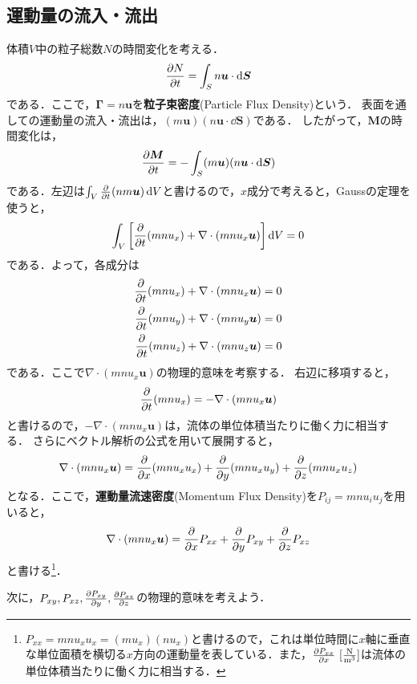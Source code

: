 \documentclass{report}
\begin{document}
    \subsection{運動量の流入・流出}
      体積$V$中の粒子総数$N$の時間変化を考える．
      \begin{align}
        \pdv{N}{t} = \int_S n\bm{u} \cdot \dd{\bm{S}}
      \end{align}
      である．ここで，$\bm{\Gamma} = n\bm{u}$を\textbf{粒子束密度}(Particle Flux Density)という．
      表面を通しての運動量の流入・流出は，$(m\bm{u})(n\bm{u}\cdot \dd{\bm{S}})$である．
      したがって，$\bm{M}$の時間変化は，
      \begin{align}
        \pdv{\bm{M}}{t} = -\int_S (m\bm{u})(n\bm{u}\cdot \dd{\bm{S}})
      \end{align}
      である．左辺は$\int_V \pdv{t}(n m \bm{u}) \dd{V}$と書けるので，$x$成分で考えると，Gaussの定理を使うと，
      \begin{align}
        \int_V \qty[\pdv{t}(mnu_x) + \nabla \cdot (mnu_x \bm{u})] \dd{V} = 0
      \end{align}
      である．よって，各成分は
      \begin{align}
        \pdv{t}(mnu_x) + \nabla \cdot (mnu_x \bm{u}) = 0\\
        \pdv{t}(mnu_y) + \nabla \cdot (mnu_y \bm{u}) = 0\\
        \pdv{t}(mnu_z) + \nabla \cdot (mnu_z \bm{u}) = 0
      \end{align}
      である．ここで$\nabla \cdot (mnu_x \bm{u}) $の物理的意味を考察する．
      右辺に移項すると，
      \begin{align}
        \pdv{t}(mnu_x) = -\nabla \cdot (mnu_x \bm{u})
      \end{align}
      と書けるので，$-\nabla \cdot (mnu_x \bm{u})$は，流体の単位体積当たりに働く力に相当する．
      さらにベクトル解析の公式を用いて展開すると，
      \begin{align}
        \nabla \cdot (mnu_x \bm{u}) = \pdv{x}(mnu_x u_x) + \pdv{y}(mnu_x u_y) + \pdv{z}(mnu_x u_z)
      \end{align}
      となる．ここで，\textbf{運動量流速密度}(Momentum Flux Density)を$P_{ij} = mnu_i u_j$を用いると，
      \begin{align}
        \nabla \cdot (mnu_x \bm{u}) = \pdv{x}P_{xx} + \pdv{y}P_{xy} + \pdv{z}P_{xz}
      \end{align}
      と書ける\footnote{$P_{xx} = mnu_xu_x = (mu_x)(nu_x)$と書けるので，これは単位時間に$x$軸に垂直な単位面積を横切る$x$方向の運動量を表している．また，$\pdv{P_{xx}}{x}\ [\frac{\r{N}}{\r{m}^3}]$は流体の単位体積当たりに働く力に相当する．}．

      次に，$P_{xy},P_{xz},\pdv{P_{xy}}{y},\pdv{P_{xz}}{z}$の物理的意味を考えよう．
\end{document}
